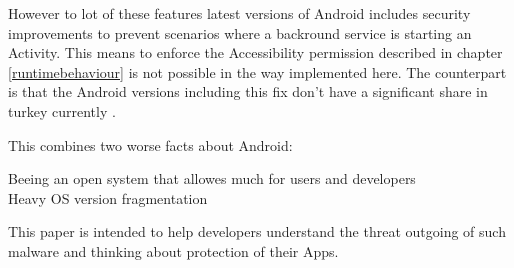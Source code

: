 \documentclass[10pt,titlepage]{article}
\begin{document}
However to lot of these features latest versions of Android includes security improvements to prevent scenarios where a backround service is starting an Activity. This means to enforce the Accessibility permission described in chapter \ref{runtimebehaviour} is not possible in the way implemented here. The counterpart is that the Android versions including this fix don't have a significant share in turkey currently \cite{TURKEYANDROIDVERSIONS}.

This combines two worse facts about Android: 
\begin{description}
\item[Beeing an open system that allowes much for users and developers]
\item[Heavy OS version fragmentation]
\end{description}

This paper is intended to help developers understand the threat outgoing of such malware and thinking about protection of their Apps.

\newpage
\lstlistoflistings
\end{document}

